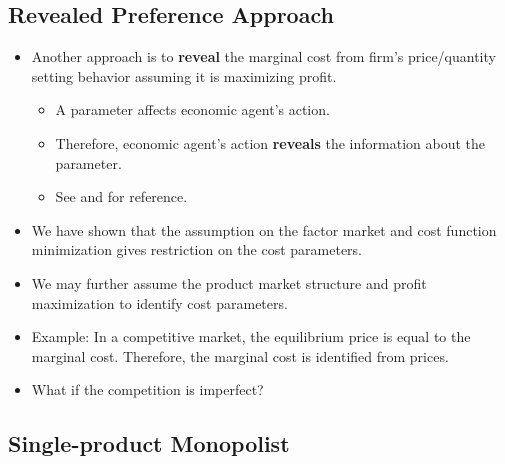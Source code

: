 \documentclass[
]{book}
\providecommand{\tightlist}{%
  \setlength{\itemsep}{0pt}\setlength{\parskip}{0pt}}
\begin{document}
\hypertarget{revealed-preference-approach}{%
\subsection{Revealed Preference Approach}\label{revealed-preference-approach}}

\begin{itemize}
\tightlist
\item
  Another approach is to \textbf{reveal} the marginal cost from firm's price/quantity setting behavior assuming it is maximizing profit.

  \begin{itemize}
  \tightlist
  \item
    A parameter affects economic agent's action.
  \item
    Therefore, economic agent's action \textbf{reveals} the information about the parameter.
  \item
    See \citet{Bresnahan1981} and \citet{Bresnahan1989} for reference.
  \end{itemize}
\item
  We have shown that the assumption on the factor market and cost function minimization gives restriction on the cost parameters.
\item
  We may further assume the product market structure and profit maximization to identify cost parameters.
\item
  Example: In a competitive market, the equilibrium price is equal to the marginal cost. Therefore, the marginal cost is identified from prices.
\item
  What if the competition is imperfect?
\end{itemize}

\hypertarget{single-product-monopolist}{%
\subsection{Single-product Monopolist}\label{single-product-monopolist}}
\end{document}
